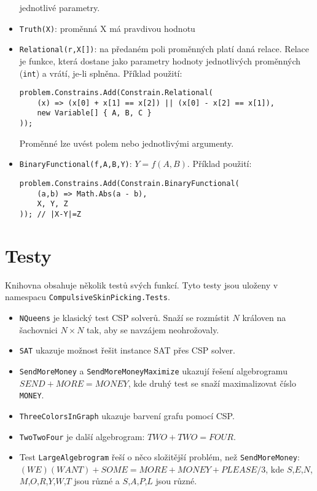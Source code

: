 \documentclass[a4paper]{article}
\begin{document}
\begin{itemize}
	jednotlivé parametry.
\item
	\texttt{Truth(X)}: proměnná X má pravdivou hodnotu
\item
	\texttt{Relational(r,X[])}: na předaném poli proměnných platí daná
	relace. Relace je funkce, která dostane jako parametry hodnoty
	jednotlivých proměnných (\texttt{int}) a vrátí, je-li splněna.
	Příklad použití:
\begin{lstlisting}
problem.Constrains.Add(Constrain.Relational(
	(x) => (x[0] + x[1] == x[2]) || (x[0] - x[2] == x[1]),
	new Variable[] { A, B, C }
));
\end{lstlisting}
	Proměnné lze uvést polem nebo jednotlivými argumenty.
\item
	\texttt{BinaryFunctional(f,A,B,Y)}: $Y=f(A,B)$. Příklad použití:
\begin{lstlisting}
problem.Constrains.Add(Constrain.BinaryFunctional(
	(a,b) => Math.Abs(a - b),
	X, Y, Z
)); // |X-Y|=Z
\end{lstlisting}
\end{itemize}

\section{Testy}

Knihovna obsahuje několik testů svých funkcí.
Tyto testy jsou uloženy v namespacu \texttt{CompulsiveSkinPicking.Tests}.

\begin{itemize}
\item
	\texttt{NQueens} je klasický test CSP solverů. Snaží se rozmístit $N$
	královen na šachovnici $N\times N$ tak, aby se navzájem neohrožovaly.
\item
	\texttt{SAT} ukazuje možnost řešit instance SAT přes CSP solver.
\item
	\texttt{SendMoreMoney} a \texttt{SendMoreMoneyMaximize} ukazují řešení
	algebrogramu $SEND+MORE=MONEY$, kde druhý test se snaží maximalizovat
	číslo \texttt{MONEY}.
\item
	\texttt{ThreeColorsInGraph} ukazuje barvení grafu pomocí CSP.
\item
	\texttt{TwoTwoFour} je další algebrogram: $TWO+TWO=FOUR$.
\item
	Test \texttt{LargeAlgebrogram} řeší o něco složitější problém, než
	\texttt{SendMoreMoney}: $(WE)(WANT)+SOME=MORE+MONEY+PLEASE/3$,
	kde $S$,$E$,$N$,$M$,$O$,$R$,$Y$,$W$,$T$ jsou různé a $S$,$A$,$P$,$L$
	jsou různé.
\end{itemize}
\end{document}
